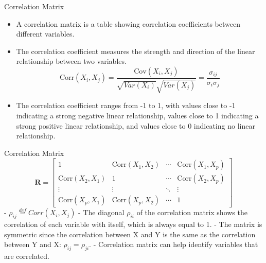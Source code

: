 \documentclass[
  ignorenonframetext,
]{beamer}
\providecommand{\tightlist}{%
  \setlength{\itemsep}{0pt}\setlength{\parskip}{0pt}}
\begin{document}
\begin{frame}{Correlation Matrix}
\protect\hypertarget{correlation-matrix}{}
\begin{itemize}
\tightlist
\item
  A correlation matrix is a table showing correlation coefficients
  between different variables.
\item
  The correlation coefficient measures the strength and direction of the
  linear relationship between two variables. \[
  \text{Corr}(X_i,X_j)=\frac{\text{Cov}(X_i,X_j)}{\sqrt{Var(X_i)}\sqrt{Var(X_j)}}=\frac{\sigma_{ij}}{\sigma_i \sigma_j}
  \]
\item
  The correlation coefficient ranges from -1 to 1, with values close to
  -1 indicating a strong negative linear relationship, values close to 1
  indicating a strong positive linear relationship, and values close to
  0 indicating no linear relationship.
\end{itemize}
\end{frame}

\begin{frame}{Correlation Matrix}
\protect\hypertarget{correlation-matrix-1}{}
\[
\mathbf{R} = \begin{bmatrix} 1 & \text{Corr}(X_1,X_2) & \cdots & \text{Corr}(X_1,X_p) \\ \text{Corr}(X_2,X_1) & 1 & \cdots & \text{Corr}(X_2,X_p) \\ \vdots & \vdots & \ddots & \vdots \\ \text{Corr}(X_p,X_1) & \text{Corr}(X_p,X_2) & \cdots & 1 \end{bmatrix}
\] - \(\rho_{ij}\overset{def}=Corr(X_i, X_j)\) - The diagonal
\(\rho_{ii}\) of the correlation matrix shows the correlation of each
variable with itself, which is always equal to 1. - The matrix is
symmetric since the correlation between X and Y is the same as the
correlation between Y and X: \(\rho_{ij}=\rho_{ji}\). - Correlation
matrix can help identify variables that are correlated.
\end{frame}
\end{document}
